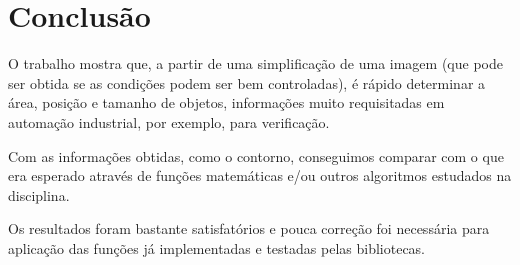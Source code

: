\documentclass[brazilian,a4paper,twocolumn]{article}
\begin{document}
\section{Conclusão}

    O trabalho mostra que, a partir de uma simplificação de uma imagem (que pode ser obtida se as condições podem ser bem controladas), é rápido determinar a área, posição e tamanho de objetos, informações muito requisitadas em automação industrial, por exemplo, para verificação.

    Com as informações obtidas, como o contorno, conseguimos comparar com o que era esperado através de funções matemáticas e/ou outros algoritmos estudados na disciplina.

    Os resultados foram bastante satisfatórios e pouca correção foi necessária para aplicação das funções já implementadas e testadas pelas bibliotecas.
\end{document}
